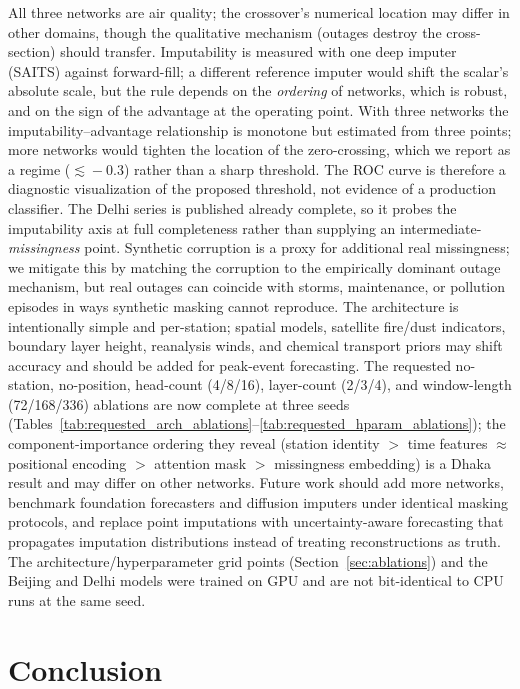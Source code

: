 \documentclass[review,3p,times]{elsarticle}
\begin{document}
All three networks are air quality; the crossover's numerical location may differ
in other domains, though the qualitative mechanism (outages destroy the
cross-section) should transfer. Imputability is measured with one deep imputer
(SAITS) against forward-fill; a different reference imputer would shift the
scalar's absolute scale, but the rule depends on the \emph{ordering} of networks,
which is robust, and on the sign of the advantage at the operating point. With
three networks the imputability--advantage relationship is monotone but
estimated from three points; more networks would tighten the location of the
zero-crossing, which we report as a regime ($\lesssim\!-0.3$) rather than a sharp
threshold. The ROC curve is therefore a diagnostic visualization of the proposed
threshold, not evidence of a production classifier. The Delhi series is
published already complete, so it probes the imputability axis at full
completeness rather than supplying an intermediate-\emph{missingness} point.
Synthetic corruption is a proxy for additional real missingness; we mitigate
this by matching the corruption to the empirically dominant outage mechanism,
but real outages can coincide with storms, maintenance, or pollution episodes in
ways synthetic masking cannot reproduce. The architecture is intentionally
simple and per-station; spatial models, satellite fire/dust indicators, boundary
layer height, reanalysis winds, and chemical transport priors may shift accuracy
and should be added for peak-event forecasting. The requested no-station,
no-position, head-count (4/8/16), layer-count (2/3/4), and window-length
(72/168/336) ablations are now complete at three seeds
(Tables~\ref{tab:requested_arch_ablations}--\ref{tab:requested_hparam_ablations});
the component-importance ordering they reveal (station identity $>$ time features
$\approx$ positional encoding $>$ attention mask $>$ missingness embedding) is a
Dhaka result and may differ on other networks. Future work should add more
networks, benchmark foundation forecasters and diffusion imputers under identical
masking protocols, and replace point imputations with uncertainty-aware
forecasting that propagates imputation distributions instead of treating
reconstructions as truth. The architecture/hyperparameter grid points
(Section~\ref{sec:ablations}) and the Beijing and Delhi models were trained on
GPU and are not bit-identical to CPU runs at the same seed.

\section{Conclusion}
\label{sec:conclusion}
\end{document}
